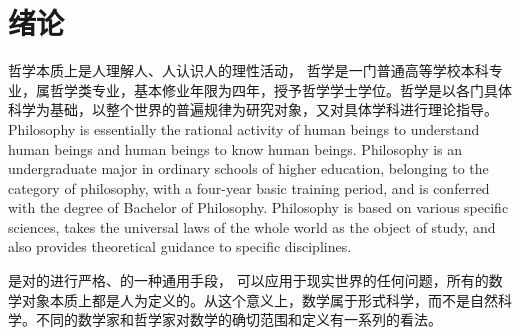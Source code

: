 \chapter{绪论}

哲学本质上是人理解人、人认识人的理性活动， 哲学是一门普通高等学校本科专业，属哲学类专业，基本修业年限为四年，授予哲学学士学位。哲学是以各门具体科学为基础，以整个世界的普遍规律为研究对象，又对具体学科进行理论指导。Philosophy is essentially the rational activity of human beings to understand human beings and human beings to know human beings. Philosophy is an undergraduate major in ordinary schools of higher education, belonging to the category of philosophy, with a four-year basic training period, and is conferred with the degree of Bachelor of Philosophy. Philosophy is based on various specific sciences, takes the universal laws of the whole world as the object of study, and also provides theoretical guidance to specific disciplines.

是对的进行严格、的一种通用手段，{ \allbfsong 可以应用于现实世界的任何问题，所有的数学对象本质上都是人为定义的。\allbfhei 从这个意义上，数学属于形式科学，而不是自然科学。\allbfkai 不同的数学家和哲学家对数学的确切范围和定义有一系列的看法。}
